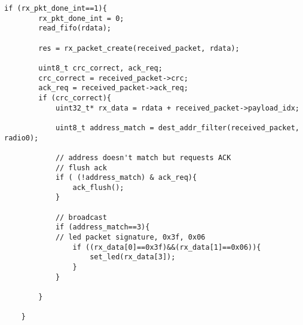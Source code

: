\begin{lstlisting}[caption=Unload packet]
	if (rx_pkt_done_int==1){
		rx_pkt_done_int = 0;
		read_fifo(rdata);

		res = rx_packet_create(received_packet, rdata);

		uint8_t crc_correct, ack_req;
		crc_correct = received_packet->crc;
		ack_req = received_packet->ack_req;
		if (crc_correct){
			uint32_t* rx_data = rdata + received_packet->payload_idx;

			uint8_t address_match = dest_addr_filter(received_packet, radio0);

			// address doesn't match but requests ACK
			// flush ack
			if ( (!address_match) & ack_req){
				ack_flush();
			}

			// broadcast 
			if (address_match==3){
			// led packet signature, 0x3f, 0x06
				if ((rx_data[0]==0x3f)&&(rx_data[1]==0x06)){
					set_led(rx_data[3]);
				}
			}

		}

	}
\end{lstlisting}
